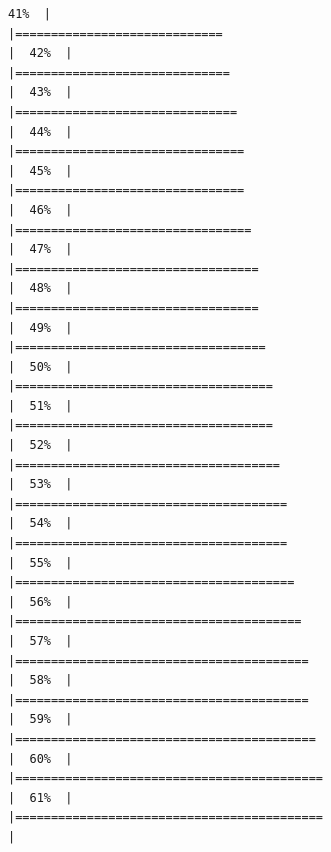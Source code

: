 \documentclass[
]{article}
\begin{document}
\begin{verbatim}
41%  |                                                                              |=============================                                         |  42%  |                                                                              |==============================                                        |  43%  |                                                                              |===============================                                       |  44%  |                                                                              |================================                                      |  45%  |                                                                              |================================                                      |  46%  |                                                                              |=================================                                     |  47%  |                                                                              |==================================                                    |  48%  |                                                                              |==================================                                    |  49%  |                                                                              |===================================                                   |  50%  |                                                                              |====================================                                  |  51%  |                                                                              |====================================                                  |  52%  |                                                                              |=====================================                                 |  53%  |                                                                              |======================================                                |  54%  |                                                                              |======================================                                |  55%  |                                                                              |=======================================                               |  56%  |                                                                              |========================================                              |  57%  |                                                                              |=========================================                             |  58%  |                                                                              |=========================================                             |  59%  |                                                                              |==========================================                            |  60%  |                                                                              |===========================================                           |  61%  |                                                                              |===========================================                           |  
\end{verbatim}
\end{document}
